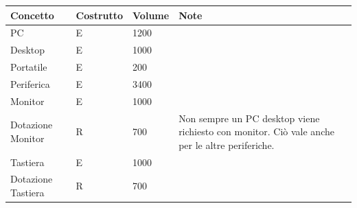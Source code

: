 \documentclass[a4paper,12pt]{report}
\begin{document}
\begin{table}[H]
    \begin{threeparttable}
    	\begin{center}
            \begin{tabular}{A|B|C|D}
                \toprule
                    \textbf{Concetto} & \textbf{Costrutto} & \textbf{Volume} & \textbf{Note} \\
                \midrule
                        \hline
                        PC
                        & E
                        & 1200
                        & \\
                        \hline
                        Desktop
                        & E
                        & 1000
                        & \\
                        \hline
                        Portatile
                        & E
                        & 200
                        & \\
                        \hline
                        Periferica
                        & E
                        & 3400
                        & \\
                        \hline
                        Monitor
                        & E
                        & 1000
                        & \\
                        \hline
                        Dotazione Monitor
                        & R
                        & 700
                        & Non sempre un PC desktop viene richiesto con monitor. Ciò vale anche per le altre periferiche. \\
                        \hline
                        Tastiera
                        & E
                        & 1000
                        & \\
                        \hline
                        Dotazione Tastiera
                        & R
                        & 700

\end{tabular}
\end{center}
\end{threeparttable}
\end{table}
\end{document}
